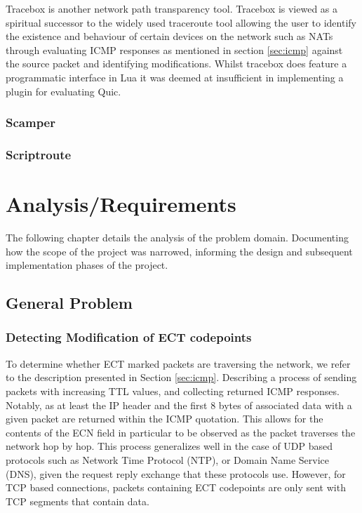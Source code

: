 \documentclass{l4proj}
\begin{document}
Tracebox is another network path transparency tool. Tracebox is viewed as a spiritual successor to the widely used traceroute tool allowing the user to identify the existence and behaviour of certain devices on the network such as NATs through evaluating ICMP responses as mentioned in section \ref{sec:icmp} against the source packet and identifying modifications. Whilst tracebox does feature a programmatic interface in Lua it was deemed at insufficient in implementing a plugin for evaluating Quic. 

\subsection{Scamper}


\subsection{Scriptroute}



\chapter{Analysis/Requirements}
\label{chap:analysis}

The following chapter details the analysis of the problem domain. Documenting how the scope of the project was narrowed, informing the design and subsequent implementation phases of the project.

\section{General Problem}

\subsection{Detecting Modification of ECT codepoints}

To determine whether ECT marked packets are traversing the network, we refer to the description presented in Section \ref{sec:icmp}. Describing a process of sending packets with increasing TTL values, and collecting returned ICMP responses. Notably, as at least the IP header and the first 8 bytes of associated data with a given packet are returned within the ICMP quotation. This allows for the contents of the ECN field in particular to be observed as the packet traverses the network hop by hop. This process generalizes well in the case of UDP based protocols such as Network Time Protocol (NTP), or Domain Name Service (DNS), given the request reply exchange that these protocols use. However, for TCP based connections, packets containing ECT codepoints are only sent with TCP segments that contain data.
\end{document}
